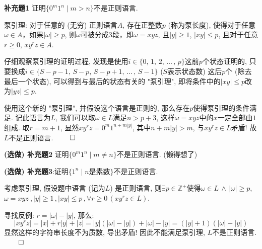 \documentclass[UTF8]{report}
\newcommand{\Z}{\mathbb{Z}}
\newcommand{\problem}[1]{{\setlength{\parskip}{10pt}\noindent \bf{#1}}}
\renewenvironment{proof}{{\setlength{\parskip}{7pt}\noindent\hskip 2em \bf 证明 \quad}}{\hfill$\qed$\par}
\begin{document}
\problem{补充题1} 证明$\{ 0^m1^n \mid m > n \}$不是正则语言.

\begin{proof}
    泵引理: 对于任意的 (无穷) 正则语言$A$, 存在正整数$p$ (称为泵长度), 使得对于任意$\omega \in A$，如果$|\omega| ≥ p$, 则$\omega$可被分成$3$段，即$\omega = xyz$, 且$|y|\geq 1$, $|xy|\leq p$, 且对于任意$r\geq 0,\, xy^rz\in A$.

    仔细观察泵引理的证明过程, 发现是使用$i\in\{0,\,1,\,2,\,\dots\,,\,p\}$这前$p$个状态证明的, 只要换成$i\in\{S-p-1,\,S-p,\,S-p+1,\,\dots\,,\,S-1\}$ ($S$表示状态数) 这后$p$个 (除去最后一个状态), 可以得到与最后的状态有关的 "泵引理", 即将条件中的$|xy|\leq p$改为$|yz|\leq p$.

    使用这个新的 "泵引理", 并假设这个语言是正则的, 那么存在$p$使得泵引理的条件满足. 记此语言为$L$, 我们可以取$\omega\in L$满足$n>p+3$, 这样$\omega = xyz$中的$x$一定全部由$1$组成. 取$r = m+1$, 显然$xy^rz = 0^m1^{n+m|y|}$, 其中$n+m|y|>m$, 与$xy^rz\in L$矛盾! 故$L$不是正则语言.
\end{proof}

\problem{(选做) 补充题2} 证明$\{ 0^m1^n \mid m \neq n \}$不是正则语言. (懒得想了)

\problem{(选做) 补充题3}:证明$\{ 1^n \mid n\text{是素数} \}$不是正则语言.

\begin{proof}
    考虑泵引理, 假设题中语言 (记为$L$) 是正则语言, 则$\exists p\in\Z^+$使得$\omega\in L \,\land\, |\omega|\geq p$, $\omega = xyz\ , |y| \geq 1\,, |xy| \leq p\,, \forall r\geq 0\, (xy^rz\in L)$.
    
    寻找反例: $r = |\omega|-|y|$, 那么:
    \[
        |xy^rz| = |x| + r|y| + |z| = |y|(|\omega|-|y|) + |\omega|-|y| = (|y| + 1)(|\omega|-|y|)
    \]
    显然这样的字符串长度不为质数, 导出矛盾! 因此不能满足泵引理, $L$不是正则语言.
\end{proof}




















%
%
\end{document}
